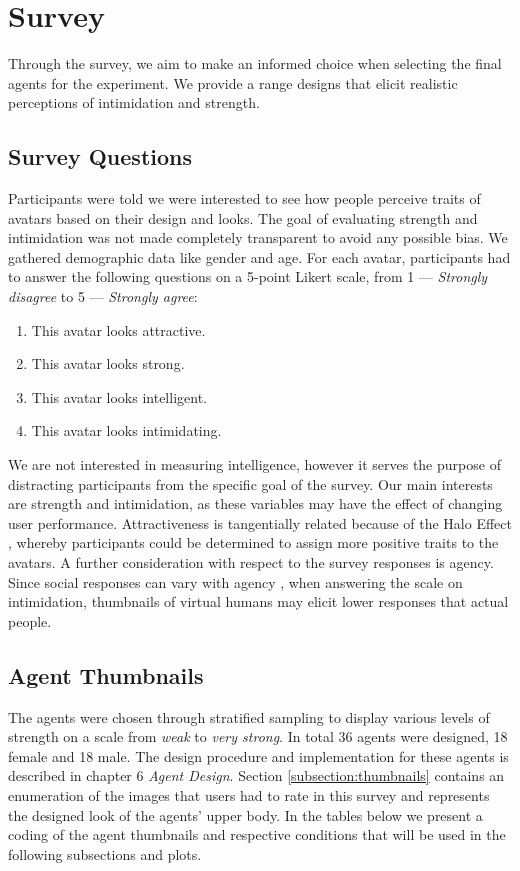 
\section{Survey}
Through the survey, we aim to make an informed choice when selecting the final agents for the experiment. We provide a range designs that elicit realistic perceptions of intimidation and strength. 

\subsection{Survey Questions}
Participants were told we were interested to see how people perceive traits of avatars based on their design and looks. The goal of evaluating strength and intimidation was not made completely transparent to avoid any possible bias. We gathered demographic data like gender and age. For each avatar, participants had to answer the following questions on a 5-point Likert scale, from 1 --- \textit{Strongly disagree} to 5 --- \textit{Strongly agree}:


\begin{enumerate}
    \item This avatar looks attractive.
    \item This avatar looks strong.
      \item This avatar looks intelligent.
      \item This avatar looks intimidating.
\end{enumerate}
   
We are not interested in measuring intelligence, however it serves the purpose of distracting participants from the specific goal of the survey. Our main interests are strength and intimidation, as these variables may have the effect of changing user performance. Attractiveness is tangentially related because of the Halo Effect \cite{nisbett1977halo}, whereby participants could be determined to assign more positive traits to the avatars. A further consideration with respect to the survey responses is agency. Since social responses can vary with agency \cite{fox2015avatars}, when answering the scale on intimidation, thumbnails of virtual humans may elicit lower responses that actual people.
 
\subsection{Agent Thumbnails}
The agents were chosen through stratified sampling to display various levels of strength on a scale from \textit{weak} to \textit{very strong}. In total 36 agents were designed, 18 female and 18 male. The design procedure and implementation for these agents is described in chapter 6 \textit{Agent Design}. Section \ref{subsection:thumbnails} contains an enumeration of the images that users had to rate in this survey and represents the designed look of the agents' upper body. 
In the tables below we present a coding of the agent thumbnails and respective conditions that will be used in the following subsections and plots.

